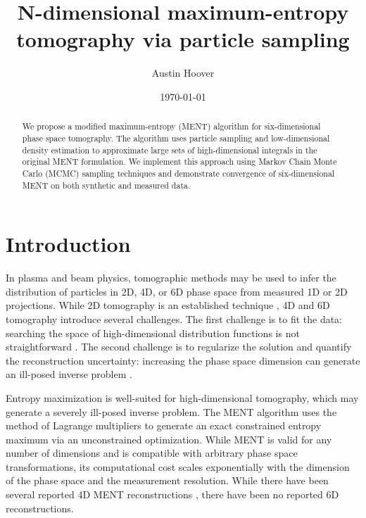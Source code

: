 \documentclass[%
    reprint,
    twocolumn,
    amsmath,
    amssymb,
    aps,
    prstab,
]{revtex4-2}
\begin{document}
\title{N-dimensional maximum-entropy tomography via particle sampling}

\author{Austin Hoover}%



\date{\today}


\begin{abstract}

We propose a modified maximum-entropy (MENT) algorithm for six-dimensional phase space tomography. The algorithm uses particle sampling and low-dimensional density estimation to approximate large sets of high-dimensional integrals in the original MENT formulation. We implement this approach using Markov Chain Monte Carlo (MCMC) sampling techniques and demonstrate convergence of six-dimensional MENT on both synthetic and measured data.
\end{abstract}


\maketitle


\section{Introduction}

In plasma and beam physics, tomographic methods may be used to infer the distribution of particles in 2D, 4D, or 6D phase space from measured 1D or 2D projections. While 2D tomography is an established technique \cite{Mckee_1995}, 4D and 6D tomography introduce several challenges. The first challenge is to fit the data: searching the space of high-dimensional distribution functions is not straightforward \cite{Wolski_2020, Wolski_2023, Roussel_2024_6d}. The second challenge is to regularize the solution and quantify the reconstruction uncertainty: increasing the phase space dimension can generate an ill-posed inverse problem \cite{Hoover_2024_mentflow}.

Entropy maximization \cite{Caticha_2004, Presse_2013} is well-suited for high-dimensional tomography, which may generate a severely ill-posed inverse problem. The MENT algorithm \cite{Minerbo_1979, Dusaussoy_1991, Mottershead_1996} uses the method of Lagrange multipliers to generate an exact constrained entropy maximum via an unconstrained optimization. While MENT is valid for any number of dimensions and is compatible with arbitrary phase space transformations, its computational cost scales exponentially with the dimension of the phase space and the measurement resolution. While there have been several reported 4D MENT reconstructions \cite{Minerbo_1981, Wong_2022, Hoover_2024_four}, there have been no reported 6D reconstructions.
\end{document}
